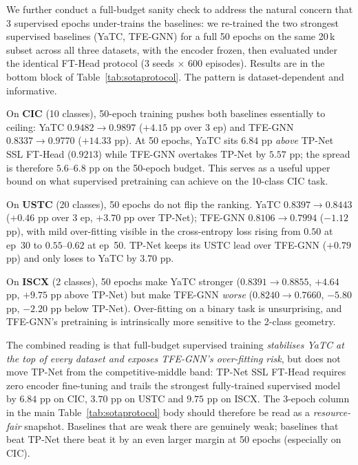 \documentclass[sensors,article,submit,moreauthors]{Definitions/mdpi}
\begin{document}
We further conduct a full-budget sanity check to address the natural concern that 3 supervised epochs under-trains the baselines: we re-trained the two strongest supervised baselines (YaTC, TFE-GNN) for a full 50 epochs on the same 20\,k subset across all three datasets, with the encoder frozen, then evaluated under the identical FT-Head protocol (3 seeds $\times$ 600 episodes). Results are in the bottom block of Table~\ref{tab:sotaprotocol}. The pattern is dataset-dependent and informative.

On \textbf{CIC} (10 classes), 50-epoch training pushes both baselines essentially to ceiling: YaTC $0.9482 \to \mathbf{0.9897}$ ($+4.15$ pp over 3 ep) and TFE-GNN $0.8337 \to \mathbf{0.9770}$ ($+14.33$ pp). At 50 epochs, YaTC sits $6.84$ pp \emph{above} TP-Net SSL FT-Head ($0.9213$) while TFE-GNN overtakes TP-Net by $5.57$ pp; the spread is therefore $5.6$--$6.8$ pp on the 50-epoch budget. This serves as a useful upper bound on what supervised pretraining can achieve on the 10-class CIC task.

On \textbf{USTC} (20 classes), 50 epochs do not flip the ranking. YaTC $0.8397 \to \mathbf{0.8443}$ ($+0.46$ pp over 3 ep, $+3.70$ pp over TP-Net); TFE-GNN $0.8106 \to \mathbf{0.7994}$ ($-1.12$ pp), with mild over-fitting visible in the cross-entropy loss rising from $0.50$ at ep~30 to $0.55$--$0.62$ at ep~50. TP-Net keeps its USTC lead over TFE-GNN ($+0.79$ pp) and only loses to YaTC by $3.70$ pp.

On \textbf{ISCX} (2 classes), 50 epochs make YaTC stronger ($0.8391 \to \mathbf{0.8855}$, $+4.64$ pp, $+9.75$ pp above TP-Net) but make TFE-GNN \emph{worse} ($0.8240 \to \mathbf{0.7660}$, $-5.80$ pp, $-2.20$ pp below TP-Net). Over-fitting on a binary task is unsurprising, and TFE-GNN's pretraining is intrinsically more sensitive to the 2-class geometry.

The combined reading is that full-budget supervised training \emph{stabilises YaTC at the top of every dataset and exposes TFE-GNN's over-fitting risk}, but does not move TP-Net from the competitive-middle band: TP-Net SSL FT-Head requires zero encoder fine-tuning and trails the strongest fully-trained supervised model by $6.84$ pp on CIC, $3.70$ pp on USTC and $9.75$ pp on ISCX. The 3-epoch column in the main Table~\ref{tab:sotaprotocol} body should therefore be read as a \emph{resource-fair} snapshot. Baselines that are weak there are genuinely weak; baselines that beat TP-Net there beat it by an even larger margin at 50 epochs (especially on CIC).
\end{document}
